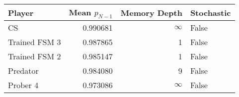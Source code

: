 \begin{tabular}{lrrl}
\toprule
        Player &  Mean $p_{N-1}$ &  Memory Depth & Stochastic \\
\midrule
            CS &        0.990681 &            \(\infty\) &      False \\
 Trained FSM 3 &        0.987865 &             1 &      False \\
 Trained FSM 2 &        0.985147 &             1 &      False \\
      Predator &        0.984080 &             9 &      False \\
      Prober 4 &        0.973086 &            \(\infty\) &      False \\
\bottomrule
\end{tabular}
